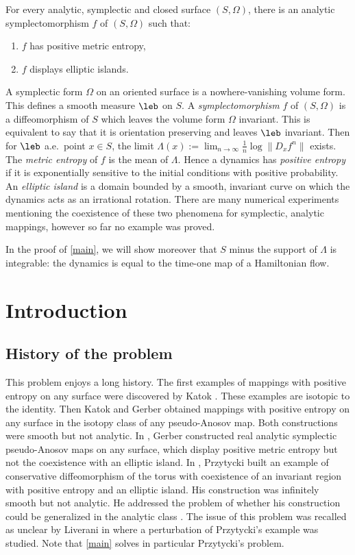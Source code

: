 \begin{theo}\label{main}
For every analytic, symplectic and closed surface $(S,\Omega)$, there is an analytic symplectomorphism $f$ of $(S,\Omega)$ such that:
\begin{enumerate}
\item $f$ has positive metric entropy,
\item $f$ displays elliptic islands.
\end{enumerate}
\end{theo}
A symplectic form $\Omega$ on an oriented surface is a nowhere-vanishing volume form. This defines a smooth measure $\leb$ on $S$. A \emph{symplectomorphism} $f$ of $(S, \Omega)$ is a diffeomorphism of $S$ which leaves the volume form $\Omega$ invariant. This is equivalent to say that it is orientation preserving and leaves $\leb$ invariant. Then for $\leb$ a.e.\ point $x\in S$, the limit $\Lambda(x):= \lim_{n\to \infty} \frac1n \log \|D_xf^n\|$ exists. The
\emph{metric entropy} of $f$ is the mean of $\Lambda$. Hence a dynamics has \emph{positive entropy} if it is exponentially sensitive to the initial conditions with positive probability. An \emph{elliptic island} is a domain bounded by a smooth, invariant curve on which the dynamics acts as an irrational rotation. There are many numerical experiments mentioning the coexistence of these two phenomena for symplectic, analytic mappings, however so far no example was proved.

\begin{remark*}
In the proof of \cref{main}, we will show moreover that $S$ minus the support of $\Lambda$ is integrable: the dynamics is equal to the time-one map of a Hamiltonian flow.
\end{remark*}

\section{Introduction}
\subsection{History of the problem}
This problem enjoys a long history. The first exam\-ples of mappings with positive entropy on any surface were discovered by Katok \cite{Ka79}. These examples are isotopic to the identity. Then Katok and Gerber \cite{GK82} obtained mappings with positive entropy on any surface in the isotopy class of any pseudo-Anosov map. Both constructions were smooth but not analytic. In \cite{Ge85}, Gerber constructed real analytic symplectic pseudo-Anosov maps on any surface, which display positive metric entropy but not the coexistence with an elliptic \hbox{island}. In \cite{Pr82}, Przytycki built an example of conservative diffeomorphism of the torus with coexistence of an invariant region with positive entropy and an elliptic island. His construction was infinitely smooth but not analytic. He addressed the problem of whether his construction could be generalized in the analytic class \cite[Rem.\,1, p.\,461]{Pr82}. The issue of this problem was recalled as unclear by Liverani in \cite[Rem.\,2.4, p.\,3]{Li04} where a perturbation of Przytycki's example was studied. Note that \cref{main} solves in particular Przytycki's problem.

